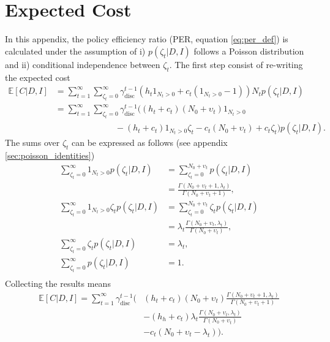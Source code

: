 \section{Expected Cost}
\label{app:expected_cost}
In this appendix, the policy efficiency ratio (PER, equation \eqref{eq:per_def}) is calculated under the assumption of i) $p(\zeta_t|D,I)$ follows a Poisson distribution and ii) conditional independence between $\zeta_t$. The first step consist of re-writing the expected cost
\begin{equation}
	\begin{split}
		\mathbb{E}[C|D,I] &= \sum_{t=1}^{\infty}\sum_{\zeta_t=0}^\infty \gamma_{\text{disc}}^{t-1} \left( h_t 1_{N_t> 0} + c_t (1_{N_t> 0}-1) \right)N_tp(\zeta_t| D, I)\\
		&= \sum_{t=1}^{\infty}\sum_{\zeta_t=0}^\infty \gamma_{\text{disc}}^{t-1} \bigg( 
		(h_t+c_t)(N_0 + \upsilon_t)1_{N_t> 0}\\
		&\qquad\qquad\qquad\quad-(h_t+c_t) 1_{N_t> 0}\zeta_t
		- c_t(N_0 + \upsilon_t)+c_t\zeta_t\bigg)p(\zeta_t| D, I).
	\end{split}
\end{equation}
The sums over $\zeta_t$ can be expressed as follows (see appendix \ref{sec:poisson_identities})
\begin{equation}
	\begin{split}
		\sum_{\zeta_t=0}^\infty1_{N_t> 0}p(\zeta_t| D, I) & = \sum_{\zeta_t=0}^{N_0+\upsilon_t} p(\zeta_t| D, I)\\
		&= \frac{\Gamma(N_0+\upsilon_t+1,\lambda_t)}{\Gamma(N_0+\upsilon_t+1)},\\
		\sum_{\zeta_t=0}^\infty1_{N_t> 0}\zeta_tp(\zeta_t| D, I) & = \sum_{\zeta_t=0}^{N_0+\upsilon_t} \zeta_t p(\zeta_t| D, I)\\
		& = \lambda_t \frac{\Gamma(N_0+\upsilon_t,\lambda_t)}{\Gamma(N_0+\upsilon_t)},\\
		\sum_{\zeta_t=0}^\infty\zeta_tp(\zeta_t| D, I) & = \lambda_t,\\
		\sum_{\zeta_t=0}^\infty p(\zeta_t| D, I) & = 1.\\
	\end{split}
\end{equation}
Collecting the results means
\begin{equation}
	\begin{split}
		\mathbb{E}[C|D,I] = \sum_{t=1}^{\infty} \gamma_{\text{disc}}^{t-1} \bigg(& 
		(h_t+c_t)(N_0 + \upsilon_t)\frac{\Gamma(N_0+\upsilon_t+1,\lambda_t)}{\Gamma(N_0+\upsilon_t+1)}\\&- (h_h+c_t)\lambda_t \frac{\Gamma(N_0+\upsilon_t,\lambda_t)}{\Gamma(N_0+\upsilon_t)}\\
		&- c_t(N_0 + \upsilon_t-\lambda_t)\bigg).
	\end{split}
	\label{eq:exact}
\end{equation}